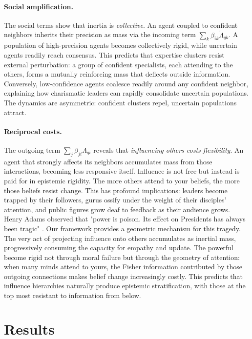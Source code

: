 \documentclass[12pt]{article}
\begin{document}
 

\paragraph{Social amplification.} The social terms show that inertia is \textit{collective}. An agent coupled to confident neighbors inherits their precision as mass via the incoming term $\sum_k \beta_{ik}\tilde{\Lambda}_{qk}$. A population of high-precision agents becomes collectively rigid, while uncertain agents readily reach consensus. This predicts that expertise clusters resist external perturbation: a group of confident specialists, each attending to the others, forms a mutually reinforcing mass that deflects outside information. Conversely, low-confidence agents coalesce readily around any confident neighbor, explaining how charismatic leaders can rapidly consolidate uncertain populations. The dynamics are asymmetric: confident clusters repel, uncertain populations attract.

 

\paragraph{Reciprocal costs.} The outgoing term $\sum_j \beta_{ji}\Lambda_{qi}$ reveals that \textit{influencing others costs flexibility}. An agent that strongly affects its neighbors accumulates mass from those interactions, becoming less responsive itself. Influence is not free but instead is paid for in epistemic rigidity. The more others attend to your beliefs, the more those beliefs resist change. This has profound implications: leaders become trapped by their followers, gurus ossify under the weight of their disciples' attention, and public figures grow deaf to feedback as their audience grows. Henry Adams observed that "power is poison. Its effect on Presidents has always been tragic" \citet{adams1918education}. Our framework provides a geometric mechanism for this tragedy. The very act of projecting influence onto others accumulates as inertial mass, progressively consuming the capacity for empathy and update. The powerful become rigid not through moral failure but through the geometry of attention: when many minds attend to yours, the Fisher information contributed by those outgoing connections makes belief change increasingly costly. This predicts that influence hierarchies naturally produce epistemic stratification, with those at the top most resistant to information from below.

\section{Results}
\end{document}

